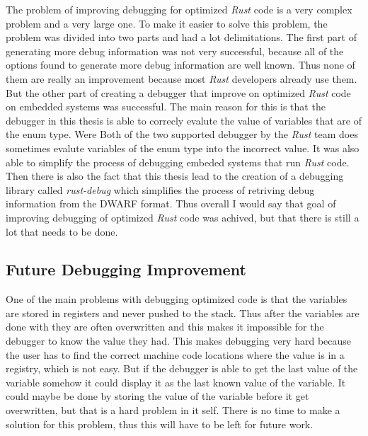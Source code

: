 
The problem of improving debugging for optimized \emph{Rust} code is a very complex problem and a very large one.
To make it easier to solve this problem, the problem was divided into two parts and had a lot delimitations.
The first part of generating more debug information was not very successful, because all of the options found to generate more debug information are well known.
Thus none of them are really an improvement because most \emph{Rust} developers already use them.
But the other part of creating a debugger that improve on optimized \emph{Rust} code on embedded systems was successful.
The main reason for this is that the debugger in this thesis is able to correcly evalute the value of variables that are of the enum type.
Were Both of the two supported debugger by the \emph{Rust} team does sometimes evalute variables of the enum type into the incorrect value.
It was also able to simplify the process of debugging embeded systems that run \emph{Rust} code.
Then there is also the fact that this thesis lead to the creation of a debugging library called \emph{rust-debug} which simplifies the process of retriving debug information from the \gls{DWARF} format.
Thus overall I would say that goal of improving debugging of optimized \emph{Rust} code was achived, but that there is still a lot that needs to be done.


\subsection{Future Debugging Improvement}
One of the main problems with debugging optimized code is that the variables are stored in registers and never pushed to the stack.
Thus after the variables are done with they are often overwritten and this makes it impossible for the debugger to know the value they had.
This makes debugging very hard because the user has to find the correct machine code locations where the value is in a registry, which is not easy.
But if the debugger is able to get the last value of the variable somehow it could display it as the last known value of the variable.
It could maybe be done by storing the value of the variable before it get overwritten, but that is a hard problem in it self.
There is no time to make a solution for this problem, thus this will have to be left for future work.


